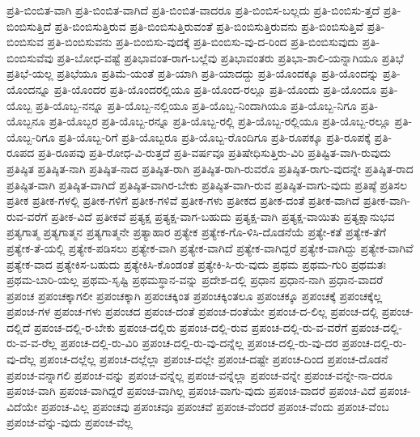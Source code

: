{ಪ್ರತಿ-ಬಿಂಬಿತ-ವಾಗಿ
ಪ್ರತಿ-ಬಿಂಬಿತ-ವಾಗಿದೆ
ಪ್ರತಿ-ಬಿಂಬಿತ-ವಾದರೂ
ಪ್ರತಿ-ಬಿಂಬಿಸ-ಬಲ್ಲದು
ಪ್ರತಿ-ಬಿಂಬಿಸು-ತ್ತದೆ
ಪ್ರತಿ-ಬಿಂಬಿಸುತ್ತಿದೆ
ಪ್ರತಿ-ಬಿಂಬಿಸುತ್ತಿರುವ
ಪ್ರತಿ-ಬಿಂಬಿಸುತ್ತಿರುವಂತೆ
ಪ್ರತಿ-ಬಿಂಬಿಸುತ್ತಿರುವನು
ಪ್ರತಿ-ಬಿಂಬಿಸುತ್ತಿವೆ
ಪ್ರತಿ-ಬಿಂಬಿಸುವ
ಪ್ರತಿ-ಬಿಂಬಿಸುವನು
ಪ್ರತಿ-ಬಿಂಬಿಸು-ವುದಕ್ಕೆ
ಪ್ರತಿ-ಬಿಂಬಿಸು-ವು-ದ-ರಿಂದ
ಪ್ರತಿ-ಬಿಂಬಿಸುವುದು
ಪ್ರತಿ-ಬಿಂಬಿಸುವೆವು
ಪ್ರತಿ-ಬೋಧ-ವಷ್ಟೆ
ಪ್ರತಿಭಾವಂತ-ರಾಗ-ಬಲ್ಲೆವು
ಪ್ರತಿಭಾವಂತರು
ಪ್ರತಿಭಾ-ಶಾಲಿ-ಯನ್ನಾಗಿಯೂ
ಪ್ರತಿಭೆ
ಪ್ರತಿಭೆ-ಯಲ್ಲ
ಪ್ರತಿಭೆಯೂ
ಪ್ರತಿಮೆ-ಯಂತೆ
ಪ್ರತಿ-ಯಾಗಿ
ಪ್ರತಿ-ಯಾದದ್ದು
ಪ್ರತಿ-ಯೊಂದಕ್ಕೂ
ಪ್ರತಿ-ಯೊಂದನ್ನು
ಪ್ರತಿ-ಯೊಂದನ್ನೂ
ಪ್ರತಿ-ಯೊಂದರ
ಪ್ರತಿ-ಯೊಂದರಲ್ಲಿಯೂ
ಪ್ರತಿ-ಯೊಂದ-ರಲ್ಲೂ
ಪ್ರತಿ-ಯೊಂದು
ಪ್ರತಿ-ಯೊಂದೂ
ಪ್ರತಿ-ಯೊಬ್ಬ
ಪ್ರತಿ-ಯೊಬ್ಬ-ನನ್ನೂ
ಪ್ರತಿ-ಯೊಬ್ಬ-ನಲ್ಲಿಯೂ
ಪ್ರತಿ-ಯೊಬ್ಬ-ನಿಂದಾಗಿಯೂ
ಪ್ರತಿ-ಯೊಬ್ಬ-ನಿಗೂ
ಪ್ರತಿ-ಯೊಬ್ಬನೂ
ಪ್ರತಿ-ಯೊಬ್ಬರ
ಪ್ರತಿ-ಯೊಬ್ಬ-ರನ್ನೂ
ಪ್ರತಿ-ಯೊಬ್ಬ-ರಲ್ಲಿ
ಪ್ರತಿ-ಯೊಬ್ಬ-ರಲ್ಲಿಯೂ
ಪ್ರತಿ-ಯೊಬ್ಬ-ರಲ್ಲೂ
ಪ್ರತಿ-ಯೊಬ್ಬ-ರಿಗೂ
ಪ್ರತಿ-ಯೊಬ್ಬ-ರಿಗೆ
ಪ್ರತಿ-ಯೊಬ್ಬರೂ
ಪ್ರತಿ-ಯೊಬ್ಬ-ರೊಂದಿಗೂ
ಪ್ರತಿ-ರೂಪಕ್ಕೂ
ಪ್ರತಿ-ರೂಪಕ್ಕೆ
ಪ್ರತಿ-ರೂಪದ
ಪ್ರತಿ-ರೂಪವು
ಪ್ರತಿ-ರೋಧ-ವಿ-ರುತ್ತದೆ
ಪ್ರತಿ-ವರ್ಷವೂ
ಪ್ರತಿಷೇಧಿಸುತ್ತಿರು-ವಿರಿ
ಪ್ರತಿಷ್ಟಿತ-ವಾಗಿ-ರುವುದು
ಪ್ರತಿಷ್ಠಿತ
ಪ್ರತಿಷ್ಠಿತ-ನಾಗಿ
ಪ್ರತಿಷ್ಠಿತ-ನಾದ
ಪ್ರತಿಷ್ಠಿತ-ರಾಗಿ
ಪ್ರತಿಷ್ಠಿತ-ರಾಗಿ-ರುವರೊ
ಪ್ರತಿಷ್ಠಿತ-ರಾಗು-ವುದನ್ನೇ
ಪ್ರತಿಷ್ಠಿತ-ರಾದ
ಪ್ರತಿಷ್ಠಿತ-ವಾಗಿ
ಪ್ರತಿಷ್ಠಿತ-ವಾಗಿದೆ
ಪ್ರತಿಷ್ಠಿತ-ವಾಗಿರ-ಬೇಕು
ಪ್ರತಿಷ್ಠಿತ-ವಾಗಿ-ರುವ
ಪ್ರತಿಷ್ಠಿತ-ವಾಗು-ವುದು
ಪ್ರತಿಷ್ಠೆ
ಪ್ರತಿಸಲ
ಪ್ರತೀಕ
ಪ್ರತೀಕ-ಗಳಲ್ಲಿ
ಪ್ರತೀಕ-ಗಳಿಗೆ
ಪ್ರತೀಕ-ಗಳಿವೆ
ಪ್ರತೀಕ-ಗಳು
ಪ್ರತೀಕದ
ಪ್ರತೀಕ-ದಂತೆ
ಪ್ರತೀಕ-ವಾಗಿದೆ
ಪ್ರತೀಕ-ವಾಗಿ-ರುವ-ವರೆಗೆ
ಪ್ರತೀಕ-ವಿದೆ
ಪ್ರತೀಕವೆ
ಪ್ರತ್ಯಕ್ಷ
ಪ್ರತ್ಯಕ್ಷ-ವಾಗ-ಬಹುದು
ಪ್ರತ್ಯಕ್ಷ-ವಾಗಿ
ಪ್ರತ್ಯಕ್ಷ-ವಾಯಿತು
ಪ್ರತ್ಯಕ್ಷಾನುಭವ
ಪ್ರತ್ಯಗಾತ್ಮ
ಪ್ರತ್ಯಗಾತ್ಮನ
ಪ್ರತ್ಯಗಾತ್ಮನೇ
ಪ್ರತ್ಯಾಹಾರ
ಪ್ರತ್ಯೇಕ
ಪ್ರತ್ಯೇಕ-ಗೊ-ಳಿಸಿ-ದೊಡನೆಯೆ
ಪ್ರತ್ಯೇ-ಕತೆ
ಪ್ರತ್ಯೇಕ-ತೆಗೆ
ಪ್ರತ್ಯೇಕ-ತೆ-ಯಲ್ಲಿ
ಪ್ರತ್ಯೇಕ-ಪಡಿಸಲು
ಪ್ರತ್ಯೇಕ-ವಾಗಿ
ಪ್ರತ್ಯೇಕ-ವಾಗಿದೆ
ಪ್ರತ್ಯೇಕ-ವಾಗಿದ್ದರೆ
ಪ್ರತ್ಯೇಕ-ವಾಗಿದ್ದು
ಪ್ರತ್ಯೇಕ-ವಾಗಿವೆ
ಪ್ರತ್ಯೇಕ-ವಾದ
ಪ್ರತ್ಯೇಕಿಸ-ಬಹುದು
ಪ್ರತ್ಯೇಕಿಸಿ-ಕೊಂಡಂತೆ
ಪ್ರತ್ಯೇಕಿ-ಸಿ-ರು-ವುದು
ಪ್ರಥಮ
ಪ್ರಥಮ-ಗುರಿ
ಪ್ರಥಮತಃ
ಪ್ರಥಮ-ಬಾರಿ-ಯಲ್ಲ
ಪ್ರಥಮ-ಸೃಷ್ಟಿ
ಪ್ರಥಮಸ್ಥಾನ-ವನ್ನು
ಪ್ರದೇಶ-ದಲ್ಲಿ
ಪ್ರಧಾನ
ಪ್ರಧಾನ-ನಾಗಿ
ಪ್ರಧಾನ-ವಾದರೆ
ಪ್ರಪಂಚ
ಪ್ರಪಂಚಕ್ಕಾಗಲೀ
ಪ್ರಪಂಚಕ್ಕಾಗಿ
ಪ್ರಪಂಚಕ್ಕಿಂತ
ಪ್ರಪಂಚಕ್ಕಿಂತಲೂ
ಪ್ರಪಂಚಕ್ಕೂ
ಪ್ರಪಂಚಕ್ಕೆ
ಪ್ರಪಂಚಕ್ಕೆಲ್ಲ
ಪ್ರಪಂಚ-ಗಳ
ಪ್ರಪಂಚ-ಗಳು
ಪ್ರಪಂಚದ
ಪ್ರಪಂಚ-ದಂತೆ
ಪ್ರಪಂಚ-ದಂತೆಯೇ
ಪ್ರಪಂಚ-ದ-ಲಿಲ್ಲ
ಪ್ರಪಂಚ-ದಲ್ಲಿ
ಪ್ರಪಂಚ-ದಲ್ಲಿದೆ
ಪ್ರಪಂಚ-ದಲ್ಲಿ-ರ-ಬೇಕು
ಪ್ರಪಂಚ-ದಲ್ಲಿರು
ಪ್ರಪಂಚ-ದಲ್ಲಿ-ರುವ
ಪ್ರಪಂಚ-ದಲ್ಲಿ-ರು-ವ-ವರೆಗೆ
ಪ್ರಪಂಚ-ದಲ್ಲಿ-ರು-ವ-ವ-ರೆಲ್ಲ
ಪ್ರಪಂಚ-ದಲ್ಲಿ-ರು-ವಿರಿ
ಪ್ರಪಂಚ-ದಲ್ಲಿ-ರು-ವು-ದನ್ನೆಲ್ಲ
ಪ್ರಪಂಚ-ದಲ್ಲಿ-ರು-ವು-ದರ
ಪ್ರಪಂಚ-ದಲ್ಲಿ-ರು-ವು-ದೆಲ್ಲ
ಪ್ರಪಂಚ-ದಲ್ಲೆಲ್ಲ
ಪ್ರಪಂಚ-ದಲ್ಲೆಲ್ಲಾ
ಪ್ರಪಂಚ-ದಲ್ಲೇ
ಪ್ರಪಂಚ-ದಷ್ಟೇ
ಪ್ರಪಂಚ-ದಿಂದ
ಪ್ರಪಂಚ-ದೊಡನೆ
ಪ್ರಪಂಚ-ವನ್ನಾಗಲಿ
ಪ್ರಪಂಚ-ವನ್ನು
ಪ್ರಪಂಚ-ವನ್ನೆಲ್ಲ
ಪ್ರಪಂಚ-ವನ್ನೆಲ್ಲಾ
ಪ್ರಪಂಚ-ವನ್ನೇ
ಪ್ರಪಂಚ-ವನ್ನೇ-ನಾ-ದರೂ
ಪ್ರಪಂಚ-ವಾಗಿ
ಪ್ರಪಂಚ-ವಾಗಿದ್ದರೆ
ಪ್ರಪಂಚ-ವಾಗಿಲ್ಲ
ಪ್ರಪಂಚ-ವಾಗು-ವುದು
ಪ್ರಪಂಚ-ವಾದರೆ
ಪ್ರಪಂಚ-ವಿದೆ
ಪ್ರಪಂಚ-ವಿದೆಯೇ
ಪ್ರಪಂಚ-ವಿಲ್ಲ
ಪ್ರಪಂಚವು
ಪ್ರಪಂಚವೂ
ಪ್ರಪಂಚವೆ
ಪ್ರಪಂಚ-ವೆಂದರೆ
ಪ್ರಪಂಚ-ವೆಂದು
ಪ್ರಪಂಚ-ವೆಂಬ
ಪ್ರಪಂಚ-ವೆನ್ನು-ವುದು
ಪ್ರಪಂಚ-ವೆಲ್ಲ
}
